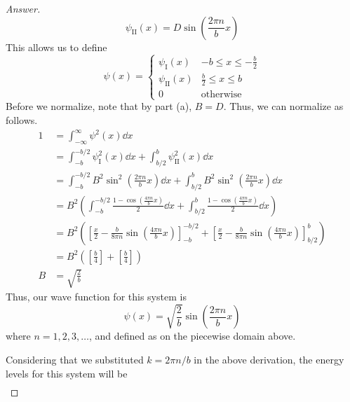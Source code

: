 \documentclass[../psets.tex]{subfiles}
\begin{document}
\begin{enumerate}
\begin{enumerate}
\begin{proof}[Answer]
\begin{equation*}
                \psi_\text{II}(x) = D\sin\left( \frac{2\pi n}{b}x \right)
            \end{equation*}
            This allows us to define
            \begin{equation*}
                \psi(x) =
                \begin{cases}
                    \psi_\text{I}(x)  & -b\leq x\leq -\frac{b}{2}\\
                    \psi_\text{II}(x) & \frac{b}{2}\leq x\leq b\\
                    0 & \text{otherwise}
                \end{cases}
            \end{equation*}
            Before we normalize, note that by part (a), $B=D$. Thus, we can normalize as follows.
            \begin{align*}
                1 &= \int_{-\infty}^\infty\psi^2(x)\dd{x}\\
                &= \int_{-b}^{-b/2}\psi_\text{I}^2(x)\dd{x}+\int_{b/2}^b\psi_\text{II}^2(x)\dd{x}\\
                &= \int_{-b}^{-b/2}B^2\sin^2\left( \frac{2\pi n}{b}x \right)\dd{x}+\int_{b/2}^bB^2\sin^2\left( \frac{2\pi n}{b}x \right)\dd{x}\\
                &= B^2\left( \int_{-b}^{-b/2}\frac{1-\cos\left( \frac{4\pi n}{b}x \right)}{2}\dd{x}+\int_{b/2}^b\frac{1-\cos\left( \frac{4\pi n}{b}x \right)}{2}\dd{x} \right)\\
                &= B^2\left( \left[ \frac{x}{2}-\frac{b}{8\pi n}\sin\left( \frac{4\pi n}{b}x \right) \right]_{-b}^{-b/2}+\left[ \frac{x}{2}-\frac{b}{8\pi n}\sin\left( \frac{4\pi n}{b}x \right) \right]_{b/2}^b \right)\\
                &= B^2\left( \left[ \frac{b}{4} \right]+\left[ \frac{b}{4} \right] \right)\\
                B &= \sqrt{\frac{2}{b}}
            \end{align*}
            Thus, our wave function for this system is
            \begin{equation*}
                \boxed{\psi(x) = \sqrt{\frac{2}{b}}\sin\left( \frac{2\pi n}{b}x \right)}
            \end{equation*}
            where $n=1,2,3,\dots$, and defined as on the piecewise domain above.\par
            Considering that we substituted $k=2\pi n/b$ in the above derivation, the energy levels for this system will be
            \begin{align*}

\end{align*}
\end{proof}
\end{enumerate}
\end{enumerate}
\end{document}
